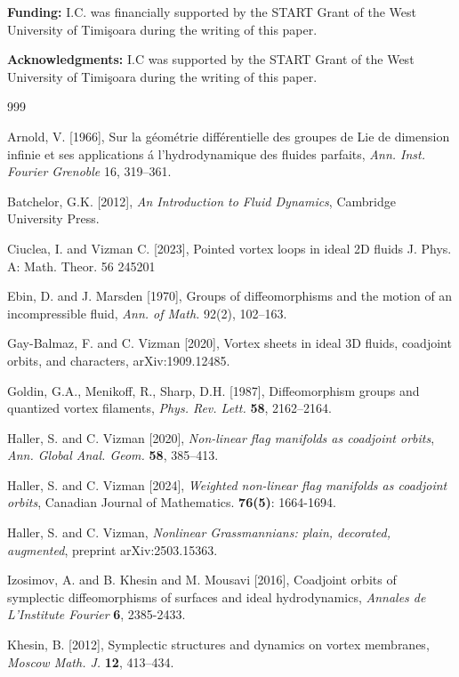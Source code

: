 \documentclass[11pt]{article}
\begin{document}
\textbf{Funding:} I.C. was financially supported by the START Grant of the West University of Timi\c soara during the writing of this paper.




\textbf{Acknowledgments:}
I.C was supported by the START Grant of the West University of Timi\c soara during the writing of this paper.

\begin{thebibliography}{999}


Arnold, V. [1966], Sur la g\'eom\'etrie diff\'erentielle des groupes de Lie de dimension infinie et ses applications \'a l’hydrodynamique des fluides parfaits, \textit{Ann. Inst. Fourier Grenoble} 16, 319--361.

Batchelor, G.K. [2012], \textit{An Introduction to Fluid Dynamics}, Cambridge University Press.

Ciuclea, I. and Vizman C. [2023], Pointed vortex loops in ideal 2D fluids J. Phys. A: Math. Theor. 56 245201

Ebin, D. and J. Marsden [1970], Groups of diffeomorphisms and the motion of an incompressible fluid, \textit{Ann. of
Math.} 92(2), 102--163.


Gay-Balmaz, F. and C. Vizman [2020],
Vortex sheets in ideal 3D fluids, coadjoint orbits, and characters, 
arXiv:1909.12485.


Goldin, G.A., Menikoff, R., Sharp, D.H. [1987], 
Diffeomorphism groups and quantized vortex filaments, \textit{Phys. Rev. Lett.} {\bf 58}, 2162--2164.

Haller, S. and C. Vizman [2020],
\textit{Non-linear flag manifolds as coadjoint orbits},
\textit{Ann. Global Anal. Geom.} \textbf{58}, 385--413.

Haller, S. and C. Vizman [2024],
\textit{Weighted non-linear flag manifolds as coadjoint orbits}, Canadian Journal of Mathematics. \textbf{76(5)}: 1664-1694.

Haller, S. and C. Vizman,
\textit{Nonlinear Grassmannians: plain, decorated, augmented}, preprint arXiv:2503.15363. 


Izosimov, A. and B. Khesin and M. Mousavi [2016], 
Coadjoint orbits of symplectic diffeomorphisms of surfaces and ideal hydrodynamics, \textit{Annales de L'Institute Fourier} {\bf 6}, 2385-2433.

Khesin, B. [2012],
Symplectic structures and dynamics on vortex membranes,
\textit{Moscow Math. J.} {\bf 12}, 413--434.


\end{thebibliography}
\end{document}
